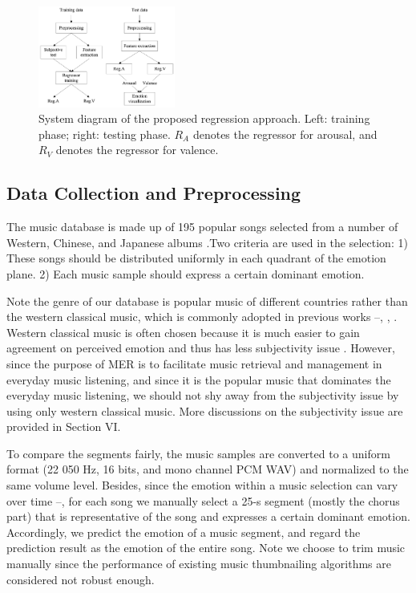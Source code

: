 \documentclass[journal, twoside]{IEEEtran}
\begin{document}
\begin{figure}[h]
\centering
\captionsetup{justification=centering}
\includegraphics[width=0.4\textwidth, height=0.3\textwidth]{fig2.png}
\caption{System diagram of the proposed regression approach. Left: training phase; right: testing phase. \(R_A\) denotes the regressor for arousal, and \(R_V\) denotes the regressor for valence.}
\label{fig2}
\end{figure}

\subsection{Data Collection and Preprocessing}
The music database is made up of 195 popular songs selected from a number of Western, Chinese, and Japanese albums \cite{8}.Two criteria are used in the selection: 1) These songs should be distributed uniformly in each quadrant of the emotion plane. 2) Each music sample should express a certain dominant emotion.

Note the genre of our database is popular music of different countries rather than the western classical music, which is commonly adopted in previous works \cite{2}--\cite{5}, \cite{10}, \cite{11}. Western classical music is often chosen because it is much easier to gain agreement on perceived emotion and thus has less subjectivity issue \cite{3}. However, since the purpose of MER is to facilitate music retrieval and management in everyday music listening,
and since it is the popular music that dominates the everyday music listening, we should not shy away from the subjectivity issue by using only western classical music. More discussions
on the subjectivity issue are provided in Section VI.

To compare the segments fairly, the music samples are converted to a uniform format (22 050 Hz, 16 bits, and mono channel PCM WAV) and normalized to the same volume level. Besides, since the emotion within a music selection can vary over time \cite{8}--\cite{11}, for each song we manually select a 25-s segment (mostly the chorus part) that is representative of the
song and expresses a certain dominant emotion. Accordingly, we predict the emotion of a music segment, and regard the prediction result as the emotion of the entire song. Note we choose to trim music manually since the performance of existing music thumbnailing algorithms \cite{26} are considered not robust enough.
\end{document}
